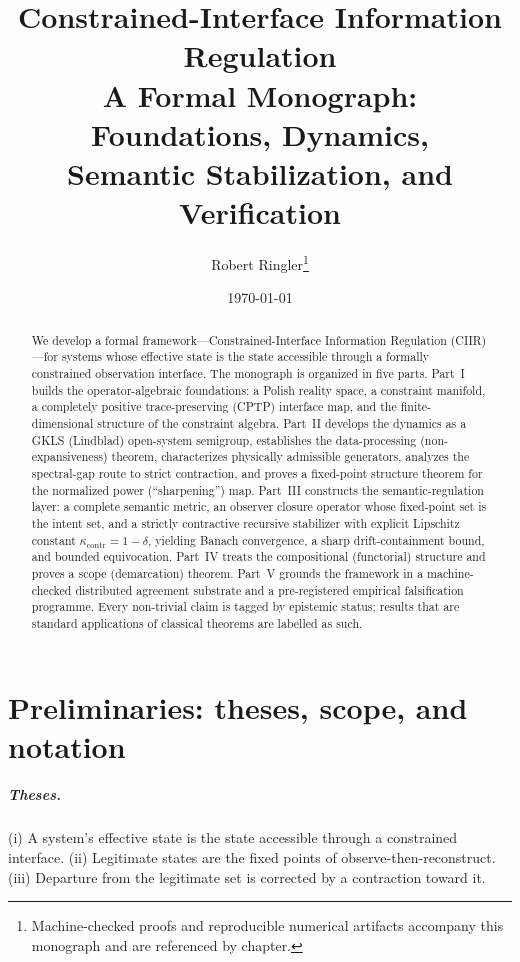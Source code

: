 \documentclass[11pt]{report}
\title{\bfseries Constrained-Interface Information Regulation\\[2mm]
\large A Formal Monograph: Foundations, Dynamics,\\
Semantic Stabilization, and Verification}
\author{Robert Ringler\thanks{Machine-checked proofs and reproducible numerical
artifacts accompany this monograph and are referenced by chapter.}}
\date{\today}
\theoremstyle{plain}
\theoremstyle{definition}
\theoremstyle{remark}
\newcommand{\kcontr}{\kappa_{\mathrm{contr}}}
\begin{document}
\maketitle

\begin{abstract}
We develop a formal framework---Constrained-Interface Information Regulation
(CIIR)---for systems whose effective state is the state accessible through a
formally constrained observation interface. The monograph is organized in five
parts. Part~I builds the operator-algebraic foundations: a Polish reality space, a
constraint manifold, a completely positive trace-preserving (CPTP) interface map,
and the finite-dimensional structure of the constraint algebra. Part~II develops the
dynamics as a GKLS (Lindblad) open-system semigroup, establishes the data-processing
(non-expansiveness) theorem, characterizes physically admissible generators,
analyzes the spectral-gap route to strict contraction, and proves a fixed-point
structure theorem for the normalized power (``sharpening'') map. Part~III constructs
the semantic-regulation layer: a complete semantic metric, an observer closure
operator whose fixed-point set is the intent set, and a strictly contractive
recursive stabilizer with explicit Lipschitz constant $\kcontr=1-\delta$, yielding
Banach convergence, a sharp drift-containment bound, and bounded equivocation.
Part~IV treats the compositional (functorial) structure and proves a scope
(demarcation) theorem. Part~V grounds the framework in a machine-checked distributed
agreement substrate and a pre-registered empirical falsification programme. Every
non-trivial claim is tagged by epistemic status; results that are standard
applications of classical theorems are labelled as such.
\end{abstract}

\tableofcontents

\chapter*{Preliminaries: theses, scope, and notation}

\paragraph{Theses.} (i) A system's effective state is the state accessible through a
constrained interface. (ii) Legitimate states are the fixed points of
observe-then-reconstruct. (iii) Departure from the legitimate set is corrected by a
contraction toward it.
\end{document}

